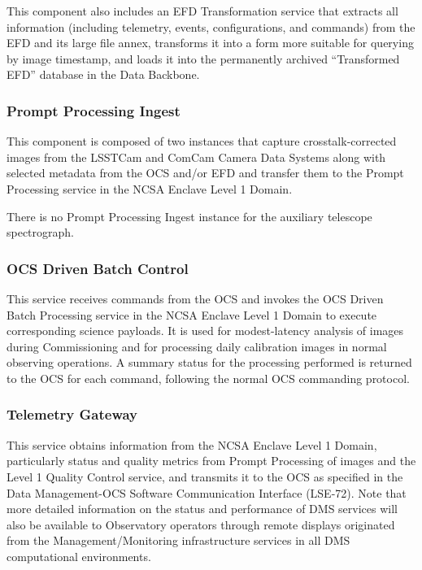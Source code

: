 \documentclass[]{article}
\begin{document}
This component also includes an EFD Transformation service that extracts
all information (including telemetry, events, configurations, and
commands) from the EFD and its large file annex, transforms it into a
form more suitable for querying by image timestamp, and loads it into
the permanently archived ``Transformed EFD'' database in the Data
Backbone.

\subsubsection{Prompt Processing Ingest}\label{prompt-processing-ingest}

This component is composed of two instances that capture
crosstalk-corrected images from the LSSTCam and ComCam Camera Data
Systems along with selected metadata from the OCS and/or EFD and
transfer them to the Prompt Processing service in the NCSA Enclave Level
1 Domain.

There is no Prompt Processing Ingest instance for the auxiliary
telescope spectrograph.

\subsubsection{OCS Driven Batch Control}\label{ocs-driven-batch-control}

This service receives commands from the OCS and invokes the OCS Driven
Batch Processing service in the NCSA Enclave Level 1 Domain to execute
corresponding science payloads. It is used for modest-latency analysis
of images during Commissioning and for processing daily calibration
images in normal observing operations. A summary status for the
processing performed is returned to the OCS for each command, following
the normal OCS commanding protocol.

\subsubsection{Telemetry Gateway}\label{telemetry-gateway}

This service obtains information from the NCSA Enclave Level 1 Domain,
particularly status and quality metrics from Prompt Processing of images
and the Level 1 Quality Control service, and transmits it to the OCS as
specified in the Data Management-OCS Software Communication Interface
(LSE-72). Note that more detailed information on the status and
performance of DMS services will also be available to Observatory
operators through remote displays originated from the
Management/Monitoring infrastructure services in all DMS computational
environments.
\end{document}
